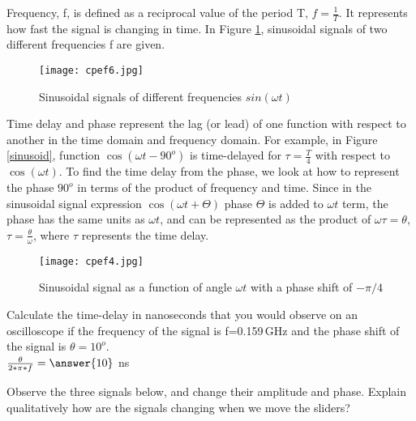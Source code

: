 \documentclass{ximera}
\begin{document}
\begin{definition}
Frequency, f,  is defined as a reciprocal value of the period T, $f=\frac{1}{T}$. It represents how fast the signal is changing in time.  In Figure \ref{sinF1F2}, sinusoidal signals of two different frequencies f are given. 

\begin{figure}[htbp]
\texttt{[image: cpef6.jpg]}
\caption{Sinusoidal signals of different frequencies $sin ( \omega t)$}
\label{sinF1F2}
\end{figure}

\end{definition}

\begin{definition}
Time delay and phase represent the lag (or lead) of one function with respect to another in the time domain and frequency domain. For example, in Figure \ref{sinusoid}, function $ \cos(\omega t - 90^o)$ is time-delayed for $\tau = \frac{T}{4}$ with respect to $\cos (\omega t)$. To find the time delay from the phase, we look at how to represent the phase $90^o$ in terms of the product of frequency and time. Since in the sinusoidal signal expression $\cos (\omega t + \Theta)$  phase $\Theta$ is added to $\omega t$ term, the phase has the same units as $\omega t$, and can be represented as the product of $\omega \tau = \theta$, $\tau = \frac{\theta}{\omega}$, where $\tau$ represents the time delay.
\end{definition}









\begin{figure} [htbp]
\texttt{[image: cpef4.jpg]}
\caption{Sinusoidal signal as a function of angle $\omega t$ with a phase shift of $-\pi/4$}
\label{sinMinus45Ph}
\end{figure}



\begin{question}  
Calculate the time-delay in nanoseconds that you would observe on an oscilloscope if the frequency of the signal is f=0.159\,GHz and the phase shift of the signal is $\theta=10^o$. \\
$ \frac{\theta}{2*\pi*f} = \answer{10}$  ns
\end{question} 

\begin{example}
Observe the three signals below, and change their amplitude and phase. Explain qualitatively how are the signals changing when we move the sliders?
\begin{center}  
\end{center} 
\end{example}
\end{document}
